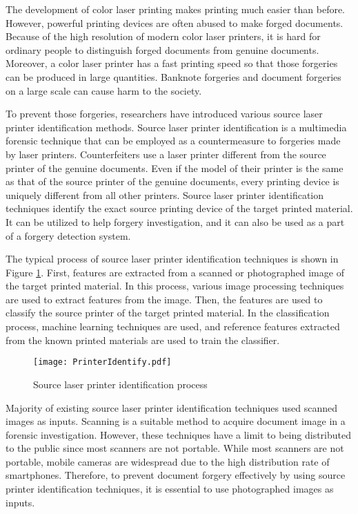 \documentclass[5p, times]{elsarticle}
\begin{document}
The development of color laser printing makes printing much easier than before. However, powerful printing devices are often abused to make forged documents. Because of the high resolution of modern color laser printers, it is hard for ordinary people to distinguish forged documents from genuine documents. Moreover, a color laser printer has a fast printing speed so that those forgeries can be produced in large quantities. Banknote forgeries and document forgeries on a large scale can cause harm to the society.

To prevent those forgeries, researchers have introduced various source laser printer identification methods. Source laser printer identification is a multimedia forensic technique that can be employed as a countermeasure to forgeries made by laser printers. Counterfeiters use a laser printer different from the source printer of the genuine documents. Even if the model of their printer is the same as that of the source printer of the genuine documents, every printing device is uniquely different from all other printers. Source laser printer identification techniques identify the exact source printing device of the target printed material. It can be utilized to help forgery investigation, and it can also be used as a part of a forgery detection system.

The typical process of source laser printer identification techniques is shown in Figure \ref{PrinterIdentify}. First, features are extracted from a scanned or photographed image of the target printed material. In this process, various image processing techniques are used to extract features from the image. Then, the features are used to classify the source printer of the target printed material. In the classification process, machine learning techniques are used, and reference features extracted from the known printed materials are used to train the classifier.

\begin{figure}[t]
    \centerline{\texttt{[image: PrinterIdentify.pdf]}}
    \caption{ Source laser printer identification process
    } \label{PrinterIdentify}
\end{figure}

Majority of existing source laser printer identification techniques used scanned images as inputs. Scanning is a suitable method to acquire document image in a forensic investigation. However, these techniques have a limit to being distributed to the public since most scanners are not portable. While most scanners are not portable, mobile cameras are widespread due to the high distribution rate of smartphones. Therefore, to prevent document forgery effectively by using source printer identification techniques, it is essential to use photographed images as inputs.
\end{document}
